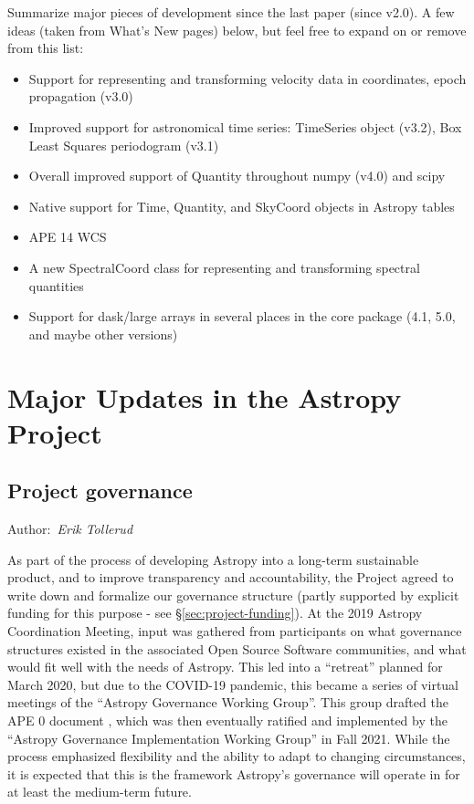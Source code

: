 \documentclass[modern]{aastex631}
\newcommand{\secauthor}[1]{{\color{blue}Author:~\textit{#1}}}
\begin{document}
Summarize major pieces of development since the last paper (since v2.0). A few
ideas (taken from What's New pages) below, but feel free to expand on or remove
from this list:
\begin{itemize}
    \item Support for representing and transforming velocity data in coordinates, epoch propagation (v3.0)
    \item Improved support for astronomical time series: TimeSeries object (v3.2), Box Least Squares periodogram (v3.1)
    \item Overall improved support of Quantity throughout numpy (v4.0) and scipy
    \item Native support for Time, Quantity, and SkyCoord objects in Astropy tables
    \item APE 14 WCS
    \item A new SpectralCoord class for representing and transforming spectral quantities
    \item Support for dask/large arrays in several places in the core package (4.1, 5.0, and maybe other versions)
\end{itemize}


\section{Major Updates in the Astropy Project} \label{sec:project-updates}

\subsection{Project governance} \label{sec:project-governance}

\secauthor{Erik Tollerud}


As part of the process of developing Astropy into a long-term sustainable
product, and to improve transparency and accountability, the Project agreed to
write down and formalize our governance structure (partly supported by explicit
funding for this purpose - see \S \ref{sec:project-funding}). At the 2019
Astropy Coordination Meeting, input was gathered from participants on what governance
structures existed in the associated Open Source Software communities, and what
would fit well with the needs of Astropy. This led into a ``retreat'' planned
for March 2020, but due to the COVID-19 pandemic, this became a series of
virtual meetings of the ``Astropy Governance Working Group''.  This group
drafted the APE 0 document \citep{ape0}, which was then eventually ratified and
implemented by the ``Astropy Governance Implementation Working Group'' in Fall
2021. While the process emphasized flexibility and the ability to adapt to
changing circumstances, it is expected that this is the framework Astropy's
governance will operate in for at least the medium-term future.
\end{document}
